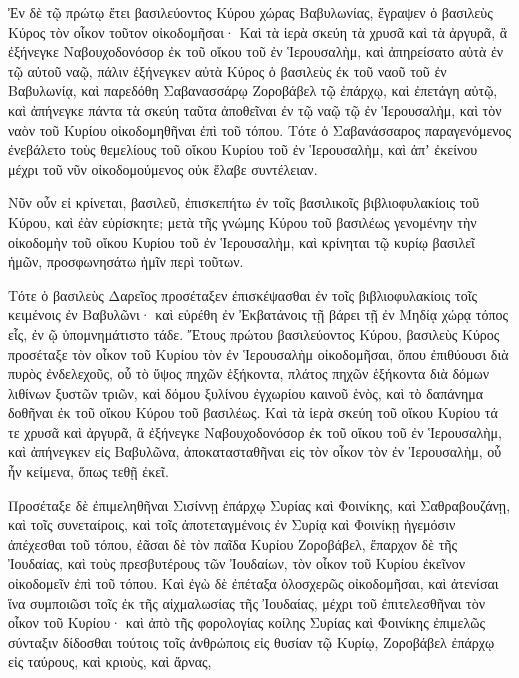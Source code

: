 {\par }{\PP {}Ἐν δὲ τῷ πρώτῳ ἔτει βασιλεύοντος Κύρου χώρας Βαβυλωνίας, ἔγραψεν ὁ βασιλεὺς Κύρος τὸν οἶκον τοῦτον οἰκοδομῆσαι·
Καὶ τὰ ἱερὰ σκεύη τὰ χρυσᾶ καὶ τὰ ἀργυρᾶ, ἃ ἐξήνεγκε Ναβουχοδονόσορ ἐκ τοῦ οἴκου τοῦ ἐν Ἱερουσαλὴμ, καὶ ἀπηρείσατο αὐτὰ ἐν τῷ αὐτοῦ ναῷ, πάλιν ἐξήνεγκεν αὐτὰ Κύρος ὁ βασιλεὺς ἐκ τοῦ ναοῦ τοῦ ἐν Βαβυλωνίᾳ, καὶ παρεδόθη Σαβανασσάρῳ Ζοροβάβελ τῷ ἐπάρχῳ,
καὶ ἐπετάγη αὐτῷ, καὶ ἀπήνεγκε πάντα τὰ σκεύη ταῦτα ἀποθεῖναι ἐν τῷ ναῷ τῷ ἐν Ἱερουσαλὴμ, καὶ τὸν ναὸν τοῦ Κυρίου οἰκοδομηθῆναι ἐπὶ τοῦ τόπου.
Τότε ὁ Σαβανάσσαρος παραγενόμενος ἐνεβάλετο τοὺς θεμελίους τοῦ οἴκου Κυρίου τοῦ ἐν Ἱερουσαλὴμ, καὶ ἀπʼ ἐκείνου μέχρι τοῦ νῦν οἰκοδομούμενος οὐκ ἔλαβε συντέλειαν.
\par }{\PP {}Νῦν οὖν εἰ κρίνεται, βασιλεῦ, ἐπισκεπήτω ἐν τοῖς βασιλικοῖς βιβλιοφυλακίοις τοῦ Κύρου,
καὶ ἐὰν εὑρίσκητε; μετὰ τῆς γνώμης Κύρου τοῦ βασιλέως γενομένην τὴν οἰκοδομὴν τοῦ οἴκου Κυρίου τοῦ ἐν Ἱερουσαλὴμ, καὶ κρίνηται τῷ κυρίῳ βασιλεῖ ἡμῶν, προσφωνησάτω ἡμῖν περὶ τοῦτων.
\par }{\PP {}Τότε ὁ βασιλεὺς Δαρεῖος προσέταξεν ἐπισκέψασθαι ἐν τοῖς βιβλιοφυλακίοις τοῖς κειμένοις ἐν Βαβυλῶνι· καὶ εὑρέθη ἐν Ἐκβατάνοις τῇ βάρει τῇ ἐν Μηδίᾳ χώρᾳ τόπος εἷς, ἐν ῷ ὑπομνημάτιστο τάδε.
Ἔτους πρώτου βασιλεύοντος Κύρου, βασιλεὺς Κύρος προσέταξε τὸν οἶκον τοῦ Κυρίου τὸν ἐν Ἱερουσαλὴμ οἰκοδομῆσαι, ὅπου ἐπιθύουσι διὰ πυρὸς ἐνδελεχοῦς, οὗ τὸ ὕψος πηχῶν ἑξήκοντα,
πλάτος πηχῶν ἑξήκοντα διὰ δόμων λιθίνων ξυστῶν τριῶν, καὶ δόμου ξυλίνου ἐγχωρίου καινοῦ ἑνὸς, καὶ τὸ δαπάνημα δοθῆναι ἐκ τοῦ οἴκου Κύρου τοῦ βασιλέως.
Καὶ τὰ ἱερὰ σκεύη τοῦ οἴκου Κυρίου τά τε χρυσᾶ καὶ ἀργυρᾶ, ἃ ἐξήνεγκε Ναβουχοδονόσορ ἐκ τοῦ οἴκου τοῦ ἐν Ἱερουσαλὴμ, καὶ ἀπήνεγκεν εἰς Βαβυλῶνα, ἀποκατασταθῆναι εἰς τὸν οἶκον τὸν ἐν Ἱερουσαλὴμ, οὗ ἦν κείμενα, ὅπως τεθῇ ἐκεῖ.
\par }{\PP {}Προσέταξε δὲ ἐπιμεληθῆναι Σισίννῃ ἐπάρχῳ Συρίας καὶ Φοινίκης, καὶ Σαθραβουζάνῃ, καὶ τοῖς συνεταίροις, καὶ τοῖς ἀποτεταγμένοις ἐν Συρίᾳ καὶ Φοινίκῃ ἡγεμόσιν ἀπέχεσθαι τοῦ τόπου, ἐᾶσαι δὲ τὸν παῖδα Κυρίου Ζοροβάβελ, ἔπαρχον δὲ τῆς Ἰουδαίας, καὶ τοὺς πρεσβυτέρους τῶν Ἰουδαίων, τὸν οἶκον τοῦ Κυρίου ἐκεῖνον οἰκοδομεῖν ἐπὶ τοῦ τόπου.
Καὶ ἐγὼ δὲ ἐπέταξα ὁλοσχερῶς οἰκοδομῆσαι, καὶ ἀτενίσαι ἵνα συμποιῶσι τοῖς ἐκ τῆς αἰχμαλωσίας τῆς Ἰουδαίας, μέχρι τοῦ ἐπιτελεσθῆναι τὸν οἶκον τοῦ Κυρίου·
καὶ ἀπὸ τῆς φορολογίας κοίλης Συρίας καὶ Φοινίκης ἐπιμελῶς σύνταξιν δίδοσθαι τούτοις τοῖς ἀνθρώποις εἰς θυσίαν τῷ Κυρίῳ, Ζοροβάβελ ἐπάρχῳ εἰς ταύρους, καὶ κριοὺς, καὶ ἄρνας,
}
